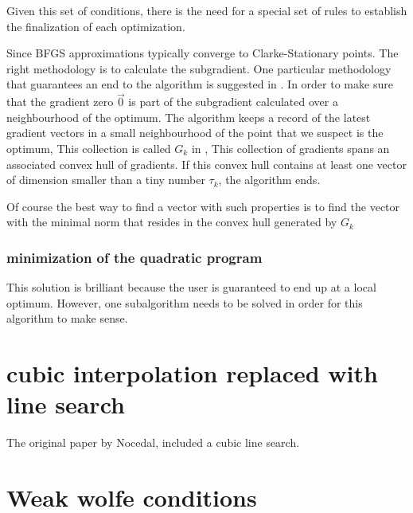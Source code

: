 Given this set of conditions, there is the need for a special set of rules to establish the finalization of each optimization.

Since BFGS approximations typically converge to Clarke-Stationary points. The right methodology is to calculate the subgradient. One particular methodology that guarantees an end to the algorithm is suggested in \citep{overtonlewis}.  In order to make sure that the gradient zero $\vec{0}$ is part of the subgradient calculated over a neighbourhood of the optimum.
The algorithm keeps a record of the latest gradient vectors in a small neighbourhood of the point that we suspect is the optimum, This collection is called $G_k$ in \citep{overtonlewis}, This collection of gradients spans an associated convex hull of gradients. If this convex hull contains at least one vector of dimension smaller than a tiny number $\tau_k$, the algorithm ends.

Of course the best way to find a vector with such properties is to find the vector with the minimal norm that resides in the convex hull generated by $G_k$

\subsubsection{minimization of the quadratic program}

This solution is brilliant because the user is guaranteed to end up at a local optimum.  However, one subalgorithm needs to be solved in order for this algorithm to make sense.

\section{cubic interpolation replaced with line search}

The original paper by Nocedal\citep{Nocedal}, included a cubic line search.

\section{Weak wolfe conditions}
